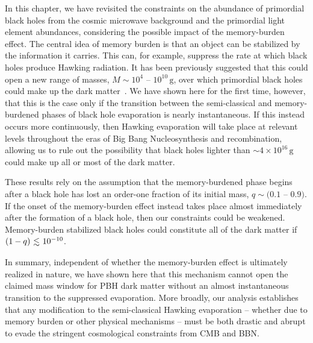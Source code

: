 In this chapter, we have revisited the constraints on the abundance of primordial black holes from the cosmic microwave background and the primordial light element abundances, considering the possible impact of the memory-burden effect. The central idea of memory burden is that an object can be stabilized by the information it carries. This can, for example, suppress the rate at which black holes produce Hawking radiation. It has been previously suggested that this could open a new range of masses, $M \sim 10^{4}$ -- $10^{10}\,\mathrm{g}$, over which primordial black holes could make up the dark matter~\cite{Dvali:2020wft, Alexandre:2024nuo, Dvali:2024hsb, Thoss:2024hsr}. We have shown here for the first time, however, that this is the case only if the transition between the semi-classical and memory-burdened phases of black hole evaporation is nearly instantaneous. If this instead occurs more continuously, then Hawking evaporation will take place at relevant levels throughout the eras of Big Bang Nucleosynthesis and recombination, allowing us to rule out the possibility that black holes lighter than $\sim 4 \times 10^{16}\,\mathrm{g}$ could make up all or most of the dark matter.

These results rely on the assumption that the memory-burdened phase begins after a black hole has lost an order-one fraction of its initial mass, $q \sim (0.1$ -- $0.9)$. If the onset of the memory-burden effect instead takes place almost immediately after the formation of a black hole, then our constraints could be weakened. Memory-burden stabilized black holes could constitute all of the dark matter if $(1-q) \lsim 10^{-10}$.

In summary, independent of whether the memory-burden effect is ultimately realized in nature, we have shown here that this mechanism cannot open the claimed mass window for PBH dark matter without an almost instantaneous transition to the suppressed evaporation. More broadly, our analysis establishes that any modification to the semi-classical Hawking evaporation -- whether due to memory burden or other physical mechanisms -- must be both drastic and abrupt to evade the stringent cosmological constraints from CMB and BBN.


